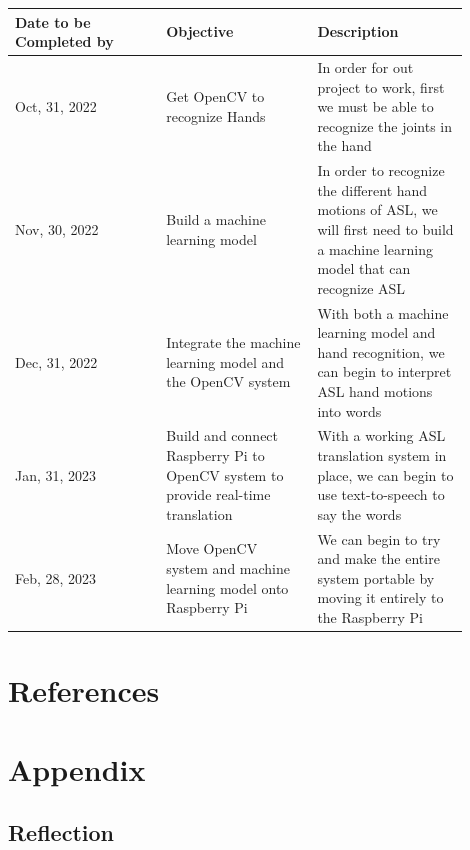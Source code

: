 \documentclass[12pt]{article}
\begin{document}
\renewcommand{\arraystretch}{1.2}
\noindent \begin{tabularx}{\textwidth}{p{0.3\linewidth}|p{0.3\linewidth}|p{0.3\linewidth}}
\toprule
\textbf{Date to be Completed by} & \textbf{Objective} & \textbf{Description}\\
\midrule
Oct, 31, 2022
& Get OpenCV to recognize Hands
& In order for out project to work, first we 
must be able to recognize the joints in the hand\\
\hline
Nov, 30, 2022
& Build a machine learning model
& In order to recognize the different hand motions
of ASL, we will first need to build a machine learning
model that can recognize ASL\\
\hline
Dec, 31, 2022
& Integrate the machine learning model and the OpenCV 
system
& With both a machine learning model and hand recognition,
we can begin to interpret ASL hand motions into words\\
\hline
Jan, 31, 2023
& Build and connect Raspberry Pi to OpenCV system to 
provide real-time translation
& With a working ASL translation system in place, we 
can begin to use text-to-speech to say the words\\
\hline
Feb, 28, 2023
& Move OpenCV system and machine learning model onto 
Raspberry Pi
& We can begin to try and make the entire system portable 
by moving it entirely to the Raspberry Pi\\
\bottomrule
\end{tabularx}

\newpage
\section{References}

\newpage
\section{Appendix}
\subsection{Reflection}
\end{document}
